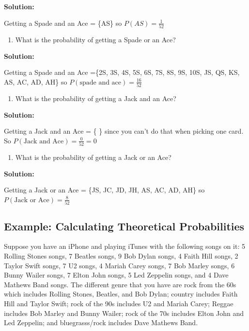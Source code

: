 \documentclass[
]{book}
\providecommand{\tightlist}{%
  \setlength{\itemsep}{0pt}\setlength{\parskip}{0pt}}
\begin{document}
\textbf{Solution:}

Getting a Spade and an Ace = \{AS\} so \(P(AS)=\frac{1}{52}\)

\begin{enumerate}
\def\labelenumi{\alph{enumi}.}
\setcounter{enumi}{6}
\tightlist
\item
  What is the probability of getting a Spade or an Ace?
\end{enumerate}

\textbf{Solution:}

Getting a Spade and an Ace =\{2S, 3S, 4S, 5S, 6S, 7S, 8S, 9S, 10S, JS, QS, KS, AS, AC, AD, AH\} so \(P(\text{spade and ace})=\frac{16}{52}\)

\begin{enumerate}
\def\labelenumi{\alph{enumi}.}
\setcounter{enumi}{7}
\tightlist
\item
  What is the probability of getting a Jack and an Ace?
\end{enumerate}

\textbf{Solution:}

Getting a Jack and an Ace = \{ \} since you can't do that when picking one card. So \(P(\text{Jack and Ace})=\frac{0}{52}=0\)

\begin{enumerate}
\def\labelenumi{\roman{enumi}.}
\tightlist
\item
  What is the probability of getting a Jack or an Ace?
\end{enumerate}

\textbf{Solution:}

Getting a Jack or an Ace = \{JS, JC, JD, JH, AS, AC, AD, AH\} so \(P(\text{Jack or Ace})=\frac{8}{52}\)

\hypertarget{example-calculating-theoretical-probabilities-2}{%
\subsection{Example: Calculating Theoretical Probabilities}\label{example-calculating-theoretical-probabilities-2}}

Suppose you have an iPhone and playing iTunes with the following songs on it: 5 Rolling Stones songs, 7 Beatles songs, 9 Bob Dylan songs, 4 Faith Hill songs, 2 Taylor Swift songs, 7 U2 songs, 4 Mariah Carey songs, 7 Bob Marley songs, 6 Bunny Wailer songs, 7 Elton John songs, 5 Led Zeppelin songs, and 4 Dave Mathews Band songs. The different genre that you have are rock from the 60s which includes Rolling Stones, Beatles, and Bob Dylan; country includes Faith Hill and Taylor Swift; rock of the 90s includes U2 and Mariah Carey; Reggae includes Bob Marley and Bunny Wailer; rock of the 70s includes Elton John and Led Zeppelin; and bluegrasss/rock includes Dave Mathews Band.
\end{document}
